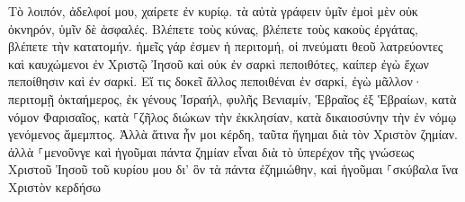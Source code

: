 \documentclass{openreader}
\begin{document}
Τὸ λοιπόν, ἀδελφοί μου, χαίρετε ἐν κυρίῳ. τὰ αὐτὰ γράφειν ὑμῖν ἐμοὶ μὲν οὐκ ὀκνηρόν, ὑμῖν δὲ ἀσφαλές. 
Βλέπετε τοὺς κύνας, βλέπετε τοὺς κακοὺς ἐργάτας, βλέπετε τὴν κατατομήν. 
ἡμεῖς γάρ ἐσμεν ἡ περιτομή, οἱ πνεύματι θεοῦ λατρεύοντες καὶ καυχώμενοι ἐν Χριστῷ Ἰησοῦ καὶ οὐκ ἐν σαρκὶ πεποιθότες, 
καίπερ ἐγὼ ἔχων πεποίθησιν καὶ ἐν σαρκί. Εἴ τις δοκεῖ ἄλλος πεποιθέναι ἐν σαρκί, ἐγὼ μᾶλλον· 
περιτομῇ ὀκταήμερος, ἐκ γένους Ἰσραήλ, φυλῆς Βενιαμίν, Ἑβραῖος ἐξ Ἑβραίων, κατὰ νόμον Φαρισαῖος, 
κατὰ ⸀ζῆλος διώκων τὴν ἐκκλησίαν, κατὰ δικαιοσύνην τὴν ἐν νόμῳ γενόμενος ἄμεμπτος. 
Ἀλλὰ ἅτινα ἦν μοι κέρδη, ταῦτα ἥγημαι διὰ τὸν Χριστὸν ζημίαν. 
ἀλλὰ ⸀μενοῦνγε καὶ ἡγοῦμαι πάντα ζημίαν εἶναι διὰ τὸ ὑπερέχον τῆς γνώσεως Χριστοῦ Ἰησοῦ τοῦ κυρίου μου δι’ ὃν τὰ πάντα ἐζημιώθην, καὶ ἡγοῦμαι ⸀σκύβαλα ἵνα Χριστὸν κερδήσω 
\end{document}

